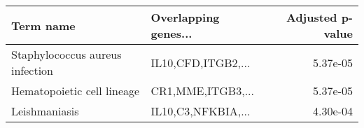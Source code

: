 \begin{tabular}{llr}
\toprule
                      Term name & Overlapping genes... &  Adjusted p-value \\
\midrule
Staphylococcus aureus infection &   IL10,CFD,ITGB2,... &          5.37e-05 \\
     Hematopoietic cell lineage &    CR1,MME,ITGB3,... &          5.37e-05 \\
                  Leishmaniasis &   IL10,C3,NFKBIA,... &          4.30e-04 \\
\bottomrule
\end{tabular}
